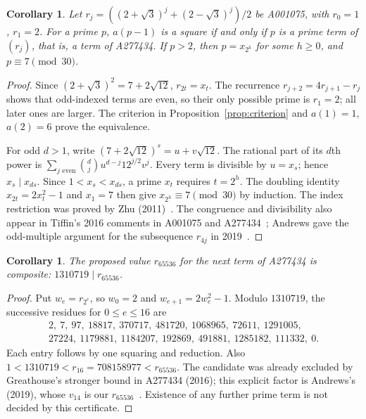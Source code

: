 \documentclass[11pt]{article}
\newtheorem{corollary}[theorem]{Corollary}
\begin{document}
\begin{corollary}\label{cor:indices}
Let $r_j=((2+\sqrt3)^j+(2-\sqrt3)^j)/2$ be A001075, with
$r_0=1$, $r_1=2$. For a prime $p$, $a(p-1)$ is a square if and only
if $p$ is a prime term of $(r_j)$, that is, a term of A277434.
If $p>2$, then $p=x_{2^h}$ for some $h\geq0$, and $p\equiv7\pmod{30}$.
\end{corollary}
\begin{proof}
Since $(2+\sqrt3)^2=7+2\sqrt{12}$, $r_{2t}=x_t$.
The recurrence $r_{j+2}=4r_{j+1}-r_j$ shows that odd-indexed terms
are even, so their only possible prime is $r_1=2$; all later ones
are larger. The criterion in Proposition~\ref{prop:criterion} and
$a(1)=1$, $a(2)=6$ prove the equivalence.

For odd $d>1$, write $(7+2\sqrt{12})^s=u+v\sqrt{12}$.
The rational part of its $d$th power is
$\sum_{j\text{ even}}\binom dj u^{d-j}12^{j/2}v^j$.
Every term is divisible by $u=x_s$; hence $x_s\mid x_{ds}$.
Since $1<x_s<x_{ds}$, a prime $x_t$ requires $t=2^h$.
The doubling identity $x_{2t}=2x_t^2-1$ and $x_1=7$
then give $x_{2^h}\equiv7\pmod{30}$ by induction.
The index restriction was proved by Zhu (2011)~\cite[p.~200]{zhu}.
The congruence and divisibility also appear in Tiffin's 2016 comments
in A001075 and A277434~\cite{tiffin,basepell}; Andrews gave the odd-multiple argument
for the subsequence $r_{4j}$ in 2019~\cite{andrews}.
\end{proof}

\begin{corollary}\label{cor:candidate}
The proposed value $r_{65536}$ for the next term of A277434 is composite:
$1310719\mid r_{65536}$.
\end{corollary}
\begin{proof}
Put $w_e=r_{2^e}$, so $w_0=2$ and $w_{e+1}=2w_e^2-1$.
Modulo $1310719$, the successive residues for $0\leq e\leq16$ are
\[
\begin{gathered}
2,\ 7,\ 97,\ 18817,\ 370717,\ 481720,\ 1068965,\ 72611,\ 1291005,\\
27224,\ 1179881,\ 1184207,\ 192869,\ 491881,\ 1285182,\ 111332,\ 0.
\end{gathered}
\]
Each entry follows by one squaring and reduction. Also
$1<1310719<r_{16}=708158977<r_{65536}$.
The candidate was already excluded by Greathouse's stronger bound in
A277434 (2016); this explicit factor is Andrews's (2019), whose
$v_{14}$ is our $r_{65536}$~\cite{tiffin,andrews}.
Existence of any further prime term is not decided by this certificate.
\end{proof}
\end{document}
